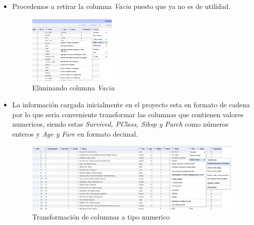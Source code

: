 \documentclass[12pt]{article}
\begin{document}
\begin{itemize}
                    \item Procedemos a retirar la columna \textit{Vacia} puesto que ya no es de utilidad.
                        \begin{figure}[!h]
                            \centering
                            \includegraphics[width=0.4\textwidth]{img/openrefine-11.png}
                            \caption{Eliminando columna \textit{Vacia}}
                        \end{figure}
                    
                    \item La información cargada inicialmente en el proyecto esta en formato de cadena por lo que seria conveniente transformar las columnas que contienen valores numericos, siendo estas \textit{Survived, PClass, Sibsp y Parch} como números enteros y \textit{Age y Fare} en formato decimal.
                        \begin{figure}[!h]
                            \centering
                            \includegraphics[width=1\textwidth]{img/openrefine-12.png}
                            \caption{Transformación de columnas a tipo numerico}
                        \end{figure}


\end{itemize}
\end{document}
